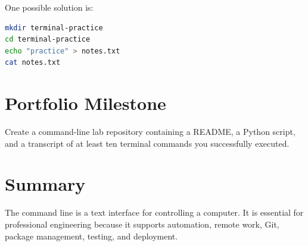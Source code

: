 \begin{solution}
One possible solution is:
\begin{lstlisting}[language=bash]
mkdir terminal-practice
cd terminal-practice
echo "practice" > notes.txt
cat notes.txt
\end{lstlisting}
\end{solution}

\section{Portfolio Milestone}

Create a command-line lab repository containing a README, a Python script, and a transcript of at least ten terminal commands you successfully executed.

\section{Summary}

The command line is a text interface for controlling a computer. It is essential for professional engineering because it supports automation, remote work, Git, package management, testing, and deployment.

